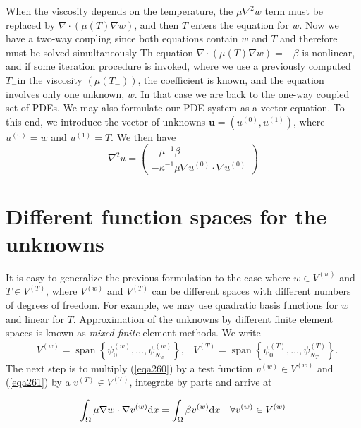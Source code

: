 \documentclass[../main.tex]{subfiles}
\begin{document}
		When the viscosity depends on the temperature, the $\mu \nabla^{2} w$ term must be replaced by $\nabla \cdot(\mu(T) \nabla w)$, and then $T$ enters the equation for $w$. Now we have a two-way coupling since both equations contain $w$ and $T$ and therefore must be solved simultaneously Th equation $\nabla \cdot(\mu(T) \nabla w)=-\beta$ is nonlinear, and if some iteration procedure is invoked, where we use a previously computed $T_{-}$in the viscosity $\left(\mu\left(T_{-}\right)\right)$, the coefficient is known, and the equation involves only one unknown, $w$. In that case we are back to the one-way coupled set of PDEs.
		We may also formulate our PDE system as a vector equation. To this end, we introduce the vector of unknowns $\boldsymbol{u}=\left(u^{(0)}, u^{(1)}\right)$, where $u^{(0)}=w$ and $u^{(1)}=T$. We then have
		$$
		\nabla^{2} u=\left(\begin{array}{c}
			-\mu^{-1} \beta \\
			-\kappa^{-1} \mu \nabla u^{(0)} \cdot \nabla u^{(0)}
		\end{array}\right)
		$$
	\section[Different function spaces for the unknowns]{Different function spaces for the unknowns}
		\label{sec:sec_20_4}
		\noindent It is easy to generalize the previous formulation to the case where $w \in V^{(w)}$ and $T \in V^{(T)}$, where $V^{(w)}$ and $V^{(T)}$ can be different spaces with different numbers of degrees of freedom. For example, we may use quadratic basis functions for $w$ and linear for $T$. Approximation of the unknowns by different finite element spaces is known as \emph{mixed finite} element methods.\smallbreak
		We write
		$$
		\begin{aligned}
			&V^{(w)}=\operatorname{span}\left\{\psi_{0}^{(w)}, \ldots, \psi_{N_{w}}^{(w)}\right\}, 
			&V^{(T)}=\operatorname{span}\left\{\psi_{0}^{(T)}, \ldots, \psi_{N_{T}}^{(T)}\right\} .
		\end{aligned}
		$$
		The next step is to multiply (\ref{eqa260}) by a test function $v^{(w)} \in V^{(w)}$ and (\ref{eqa261}) by a $v^{(T)} \in V^{(T)}$, integrate by parts and arrive at
		
		
		\begin{equation}
			\label{eqa288}
			\int_{\Omega} \mu \nabla w \cdot \nabla v^{(w)} \mathrm{d} x=\int_{\Omega} \beta v^{(w)} \mathrm{d} x \quad \forall v^{(w)} \in V^{(w)} \\
		\end{equation}
	
\end{document}
